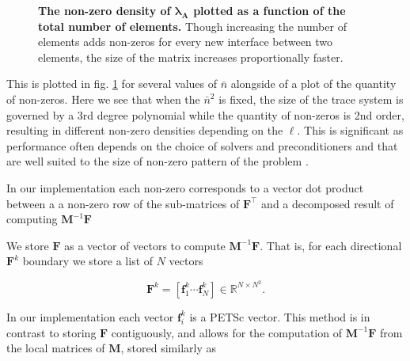 \begin{figure}
	{\centering
	\begin{subfigure}{\columnwidth}
		\centering
		
	\end{subfigure}
	\begin{subfigure}{\columnwidth}
		\centering
		
	\end{subfigure}}
	\caption[The non-zero density of $\symbf{\lambda}_{\textbf{A}}$ 
	plotted as a function of the total number of elements.]{\textbf{The non-zero 
	density of $\symbf{\lambda}_{\textbf{A}}$ plotted as a function of 
	the total number of elements.} Though increasing the number of elements adds non-zeros for every new 
	interface between two elements, the size of the matrix increases 
	proportionally faster.}
	\label{fig:nz_density} 
\end{figure}

\noindent
This is plotted in fig. \ref{fig:nz_density} for several values of $\bar{n}$ alongside of a plot of the quantity of non-zeros. Here we see that when the $\bar{n}^2$ is fixed, the size of the trace system is governed by a 3rd degree polynomial while the quantity of non-zeros is 2nd order, resulting in different non-zero densities depending on the $\ell$. This is significant as performance often depends on the choice of solvers and preconditioners and that are well suited to the size of non-zero pattern of the problem \citep{bollhofer2020state}. %

In our implementation each non-zero corresponds to a vector dot product between a a non-zero row of the sub-matrices of $\textbf{F}^{\intercal}$ and a decomposed result of computing  $\textbf{M}^{-1}\textbf{F}$

\noindent
We store $\textbf{F}$ as a vector of vectors to compute $\textbf{M}^{-1}\textbf{F}$. That is, for each directional $\textbf{F}^k$ boundary we store a list of $N$ vectors

\begin{equation}
	\textbf{F}^k = \left[\textbf{f}^k_1 \cdots \textbf{f}^k_N\right] \in \mathbb{R}^{N \times N^2}.
\end{equation} 

\noindent
In our implementation each vector $\textbf{f}^k_i$ is a PETSc vector. This method is in contrast to storing $\textbf{F}$ contiguously, and allows for the computation of $\textbf{M}^{-1}\textbf{F}$ from the local matrices of $\textbf{M}$, stored similarly as

